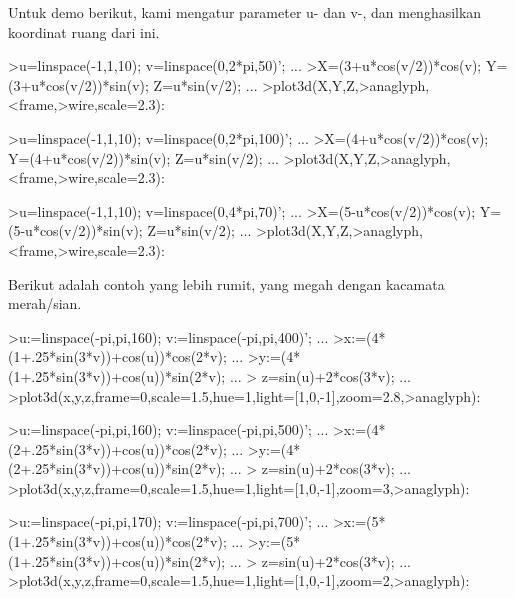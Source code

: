 \documentclass[a4paper,10pt]{article}
\begin{document}
\begin{eulernotebook}
\begin{eulercomment}
\begin{eulercomment}
\begin{eulercomment}
Untuk demo berikut, kami mengatur parameter u- dan v-, dan
menghasilkan koordinat ruang dari ini.
\end{eulercomment}
\begin{eulerprompt}
>u=linspace(-1,1,10); v=linspace(0,2*pi,50)'; ...
>X=(3+u*cos(v/2))*cos(v); Y=(3+u*cos(v/2))*sin(v); Z=u*sin(v/2); ...
>plot3d(X,Y,Z,>anaglyph,<frame,>wire,scale=2.3):
\end{eulerprompt}
\begin{eulerprompt}
>u=linspace(-1,1,10); v=linspace(0,2*pi,100)'; ...
>X=(4+u*cos(v/2))*cos(v); Y=(4+u*cos(v/2))*sin(v); Z=u*sin(v/2); ...
>plot3d(X,Y,Z,>anaglyph,<frame,>wire,scale=2.3):
\end{eulerprompt}
\begin{eulerprompt}
>u=linspace(-1,1,10); v=linspace(0,4*pi,70)'; ...
>X=(5-u*cos(v/2))*cos(v); Y=(5-u*cos(v/2))*sin(v); Z=u*sin(v/2); ...
>plot3d(X,Y,Z,>anaglyph,<frame,>wire,scale=2.3):
\end{eulerprompt}
\begin{eulercomment}
Berikut adalah contoh yang lebih rumit, yang megah dengan kacamata
merah/sian.
\end{eulercomment}
\begin{eulerprompt}
>u:=linspace(-pi,pi,160); v:=linspace(-pi,pi,400)';  ...
>x:=(4*(1+.25*sin(3*v))+cos(u))*cos(2*v); ...
>y:=(4*(1+.25*sin(3*v))+cos(u))*sin(2*v); ...
> z=sin(u)+2*cos(3*v); ...
>plot3d(x,y,z,frame=0,scale=1.5,hue=1,light=[1,0,-1],zoom=2.8,>anaglyph):
\end{eulerprompt}
\begin{eulerprompt}
>u:=linspace(-pi,pi,160); v:=linspace(-pi,pi,500)';  ...
>x:=(4*(2+.25*sin(3*v))+cos(u))*cos(2*v); ...
>y:=(4*(2+.25*sin(3*v))+cos(u))*sin(2*v); ...
> z=sin(u)+2*cos(3*v); ...
>plot3d(x,y,z,frame=0,scale=1.5,hue=1,light=[1,0,-1],zoom=3,>anaglyph):
\end{eulerprompt}
\begin{eulerprompt}
>u:=linspace(-pi,pi,170); v:=linspace(-pi,pi,700)';  ...
>x:=(5*(1+.25*sin(3*v))+cos(u))*cos(2*v); ...
>y:=(5*(1+.25*sin(3*v))+cos(u))*sin(2*v); ...
> z=sin(u)+2*cos(3*v); ...
>plot3d(x,y,z,frame=0,scale=1.5,hue=1,light=[1,0,-1],zoom=2,>anaglyph):

\end{eulerprompt}
\end{eulercomment}
\end{eulercomment}
\end{eulernotebook}
\end{document}
